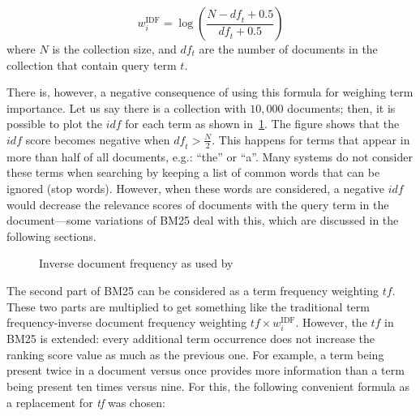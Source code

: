 \begin{equation} 
	w_i^{\text{IDF}} = \log\left(\frac{N-\mathit{df}_t+0.5}{\mathit{df}_t+0.5}\right)
\end{equation}
where $N$ is the collection size, and $df_t$ are the number of documents in the collection that contain query term $t$.  

There is, however, a negative consequence of using this formula for weighing term importance. Let us say there is a collection with $10,000$ documents; then, it is possible to plot the $\mathit{idf}$ for each term as shown in~\cref{idf}. The figure shows that the $\mathit{idf}$ score becomes negative when $\mathit{df}_t > \frac{N}{2}$. This happens for terms that appear in more than half of all documents, e.g.: ``the'' or ``a''. Many systems do not consider these terms when searching by keeping a list of common words that can be ignored (stop words). However, when these words are considered,  a negative $\mathit{idf}$ would decrease the relevance scores of documents with the query term in the document—some variations of BM25 deal with this, which are discussed in the following sections.  

\begin{figure}
	\caption{Inverse document frequency as used by \citet{bm25-robertson}}
	\label{idf}
\end{figure}

The second part of BM25 can be considered as a term frequency weighting $\mathit{tf}$. These two parts are multiplied to get something like the traditional term frequency-inverse document frequency weighting $\mathit{tf} \times w_i^{\text{IDF}}$.
However, the $\mathit{tf}$ in BM25 is extended: every additional term occurrence does not increase the ranking score value as much as the previous one. For example, a term being present twice in a document versus once provides more information than a term being present ten times versus nine. For this, the following convenient formula as a replacement for \textit{tf} was chosen:

